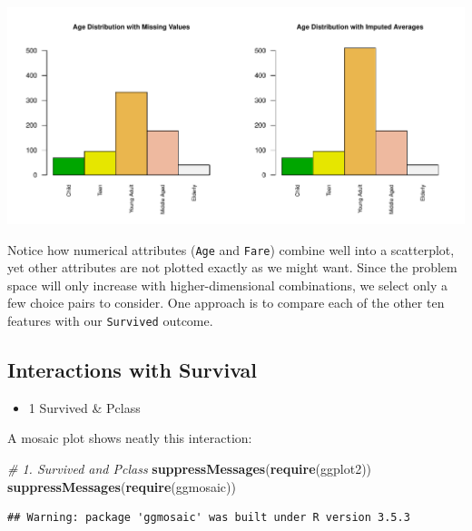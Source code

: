 \documentclass[]{article}
\newenvironment{Shaded}{\begin{snugshade}}{\end{snugshade}}
\newcommand{\KeywordTok}[1]{\textcolor[rgb]{0.13,0.29,0.53}{\textbf{#1}}}
\newcommand{\CommentTok}[1]{\textcolor[rgb]{0.56,0.35,0.01}{\textit{#1}}}
\newcommand{\NormalTok}[1]{#1}
\providecommand{\tightlist}{%
  \setlength{\itemsep}{0pt}\setlength{\parskip}{0pt}}
\begin{document}
\includegraphics{Titanic_Survival_files/figure-latex/unnamed-chunk-21-1.pdf}

Notice how numerical attributes (\texttt{Age} and \texttt{Fare}) combine
well into a scatterplot, yet other attributes are not plotted exactly as
we might want. Since the problem space will only increase with
higher-dimensional combinations, we select only a few choice pairs to
consider. One approach is to compare each of the other ten features with
our \texttt{Survived} outcome.

\subsection{Interactions with
Survival}\label{interactions-with-survival}

\begin{itemize}
\tightlist
\item
  1 Survived \& Pclass
\end{itemize}

A mosaic plot shows neatly this interaction:

\begin{Shaded}
\begin{Highlighting}[]
\CommentTok{# 1. Survived and Pclass }
\KeywordTok{suppressMessages}\NormalTok{(}\KeywordTok{require}\NormalTok{(ggplot2))}
\KeywordTok{suppressMessages}\NormalTok{(}\KeywordTok{require}\NormalTok{(ggmosaic))}
\end{Highlighting}
\end{Shaded}

\begin{verbatim}
## Warning: package 'ggmosaic' was built under R version 3.5.3
\end{verbatim}
\end{document}
